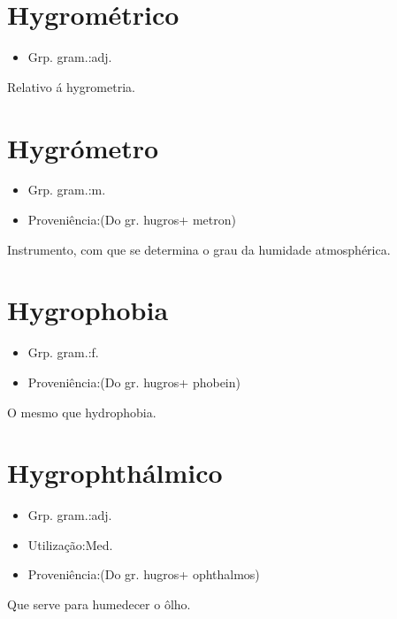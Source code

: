 \documentclass{article}
\begin{document}
\section{Hygrométrico}
\begin{itemize}
\item {Grp. gram.:adj.}
\end{itemize}
Relativo á hygrometria.
\section{Hygrómetro}
\begin{itemize}
\item {Grp. gram.:m.}
\end{itemize}
\begin{itemize}
\item {Proveniência:(Do gr. \textunderscore hugros\textunderscore  + \textunderscore metron\textunderscore )}
\end{itemize}
Instrumento, com que se determina o grau da humidade atmosphérica.
\section{Hygrophobia}
\begin{itemize}
\item {Grp. gram.:f.}
\end{itemize}
\begin{itemize}
\item {Proveniência:(Do gr. \textunderscore hugros\textunderscore  + \textunderscore phobein\textunderscore )}
\end{itemize}
O mesmo que \textunderscore hydrophobia\textunderscore .
\section{Hygrophthálmico}
\begin{itemize}
\item {Grp. gram.:adj.}
\end{itemize}
\begin{itemize}
\item {Utilização:Med.}
\end{itemize}
\begin{itemize}
\item {Proveniência:(Do gr. \textunderscore hugros\textunderscore  + \textunderscore ophthalmos\textunderscore )}
\end{itemize}
Que serve para humedecer o ôlho.
\end{document}
